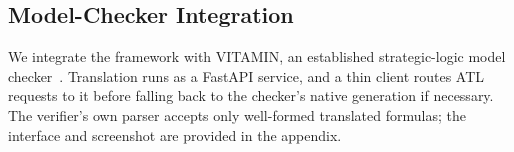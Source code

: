 \subsection{Model-Checker Integration}
\label{subsec:integration}
We integrate the framework with \textsc{VITAMIN}, an established strategic-logic model checker~\cite{DBLP:conf/ifaamas/0001M25}. Translation runs as a FastAPI service, and a thin client routes ATL requests to it before falling back to the checker's native generation if necessary. The verifier's own parser accepts only well-formed translated formulas; the interface and screenshot are provided in the appendix.